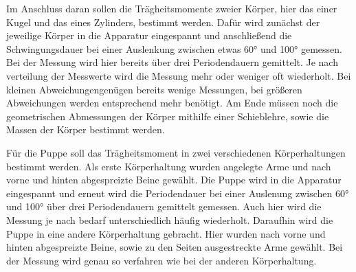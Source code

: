 Im Anschluss daran sollen die Trägheitsmomente zweier Körper, hier das einer Kugel und
das eines Zylinders, bestimmt werden. Dafür wird zunächst der jeweilige Körper in
die Apparatur eingespannt und anschließend die Schwingungsdauer bei einer Auslenkung
zwischen etwas 60° und 100° gemessen. Bei der Messung wird hier bereits über drei
Periodendauern gemittelt. Je nach verteilung der Messwerte wird die Messung mehr
oder weniger oft wiederholt. Bei kleinen Abweichungengenügen bereits wenige Messungen,
bei größeren Abweichungen werden entsprechend mehr benötigt. Am Ende müssen noch die
geometrischen Abmessungen der Körper mithilfe einer Schieblehre, sowie die Massen der
Körper bestimmt werden.

Für die Puppe soll das Trägheitsmoment in zwei verschiedenen Körperhaltungen bestimmt
werden. Als erste Körperhaltung wurden angelegte Arme und nach vorne und hinten
abgespreizte Beine gewählt. Die Puppe wird in die Apparatur eingespannt und erneut
wird die Periodendauer bei einer Auslenung zwischen 60° und 100° über drei
Periodendauern gemittelt gemessen. Auch hier wird die Messung je nach bedarf
unterschiedlich häufig wiederholt. Daraufhin wird die Puppe in eine andere
Körperhaltung gebracht. Hier wurden nach vorne und hinten abgespreizte Beine,
sowie zu den Seiten ausgestreckte Arme gewählt. Bei der Messung wird genau so
verfahren wie bei der anderen Körperhaltung.
